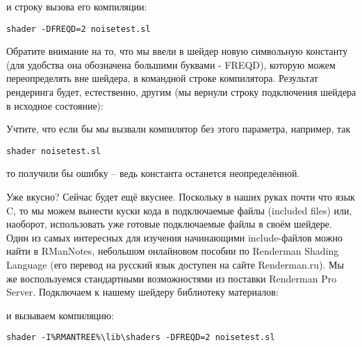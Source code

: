 
 и строку вызова его компиляции:
  
\begin{lstlisting}[frame=single, framerule=0pt, framesep=10pt, xleftmargin=10pt, xrightmargin=10pt, basicstyle=\ttfamily \small, backgroundcolor=\color{light-gray}]
shader -DFREQD=2 noisetest.sl
\end{lstlisting}

 Обратите внимание на то, что мы ввели в шейдер
    новую символьную константу (для удобства она обозначена большими
    буквами - FREQD), которую можем переопределять вне шейдера, в
    командной строке компилятора. Результат рендеринга будет,
    естественно, другим (мы вернули строку подключения шейдера в
    исходное состояние):
  

  

 Учтите, что если бы мы вызвали компилятор без этого
    параметра, например, так
  
\begin{lstlisting}[frame=single, framerule=0pt, framesep=10pt, xleftmargin=10pt, xrightmargin=10pt, basicstyle=\ttfamily \small, backgroundcolor=\color{light-gray}]
shader noisetest.sl
\end{lstlisting}

 то получили бы ошибку – ведь константа останется
    неопределённой.
  

 Уже вкусно? Сейчас будет ещё вкуснее. Поскольку в
    наших руках почти что язык C, то мы можем вынести куски кода в
    подключаемые файлы (included files) или, наоборот, использовать уже
    готовые подключаемые файлы в своём шейдере. Один из самых
    интересных для изучения начинающими include-файлов можно найти в
    RManNotes, небольшом онлайновом пособии по Renderman Shading
    Language (его перевод на русский язык доступен на сайте
    Renderman.ru). Мы же воспользуемся стандартными возможностями из
    поставки Renderman Pro Server. Подключаем к нашему шейдеру
    библиотеку материалов:
  


 и вызываем компиляцию:
  
\begin{lstlisting}[frame=single, framerule=0pt, framesep=10pt, xleftmargin=10pt, xrightmargin=10pt, basicstyle=\ttfamily \small, backgroundcolor=\color{light-gray}]
shader -I%RMANTREE%\lib\shaders -DFREQD=2 noisetest.sl
\end{lstlisting}  

